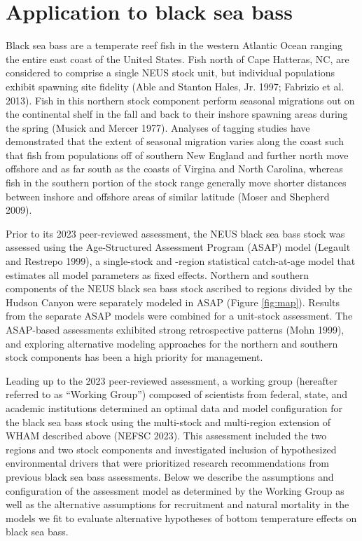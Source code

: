 \documentclass[
]{article}
\begin{document}
\hypertarget{application-to-black-sea-bass}{%
\section*{Application to black sea bass}\label{application-to-black-sea-bass}}

Black sea bass are a temperate reef fish in the western Atlantic Ocean ranging the entire east coast of the United States. Fish north of Cape Hatteras, NC, are considered to comprise a single NEUS stock unit, but individual populations exhibit spawning site fidelity (Able and Stanton Hales, Jr. 1997; Fabrizio et al. 2013). Fish in this northern stock component perform seasonal migrations out on the continental shelf in the fall and back to their inshore spawning areas during the spring (Musick and Mercer 1977). Analyses of tagging studies have demonstrated that the extent of seasonal migration varies along the coast such that fish from populations off of southern New England and further north move offshore and as far south as the coasts of Virgina and North Carolina, whereas fish in the southern portion of the stock range generally move shorter distances between inshore and offshore areas of similar latitude (Moser and Shepherd 2009).

Prior to its 2023 peer-reviewed assessment, the NEUS black sea bass stock was assessed using the Age-Structured Assessment Program (ASAP) model (Legault and Restrepo 1999), a single-stock and -region statistical catch-at-age model that estimates all model parameters as fixed effects. Northern and southern components of the NEUS black sea bass stock ascribed to regions divided by the Hudson Canyon were separately modeled in ASAP (Figure \ref{fig:map}). Results from the separate ASAP models were combined for a unit-stock assessment. The ASAP-based assessments exhibited strong retrospective patterns (Mohn 1999), and exploring alternative modeling approaches for the northern and southern stock components has been a high priority for management.

Leading up to the 2023 peer-reviewed assessment, a working group (hereafter referred to as ``Working Group'') composed of scientists from federal, state, and academic institutions determined an optimal data and model configuration for the black sea bass stock using the multi-stock and multi-region extension of WHAM described above (NEFSC 2023). This assessment included the two regions and two stock components and investigated inclusion of hypothesized environmental drivers that were prioritized research recommendations from previous black sea bass assessments. Below we describe the assumptions and configuration of the assessment model as determined by the Working Group as well as the alternative assumptions for recruitment and natural mortality in the models we fit to evaluate alternative hypotheses of bottom temperature effects on black sea bass.
\end{document}
